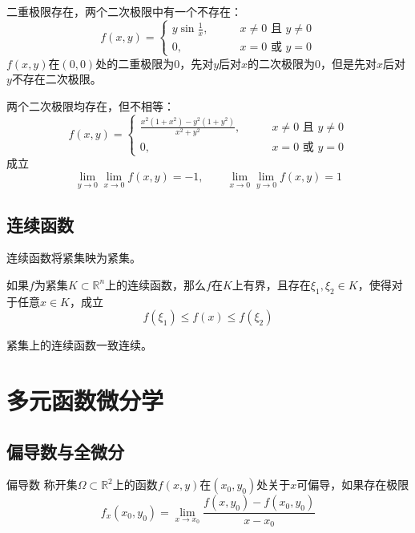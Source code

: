 \documentclass[lang = cn, scheme = chinese, thmcnt = section]{elegantbook}
\newcommand{\R}{\mathbb{R}}            %
\newcommand{\sub}{\subset}             %
\begin{document}
\begin{example}
	二重极限存在，两个二次极限中有一个不存在：
	$$
	f(x,y)=
	\begin{cases}
		y\sin\frac{1}{x},\qquad & x\ne 0\text{ 且 }y\ne 0\\
		0,\qquad & x= 0\text{ 或 }y=0
	\end{cases}
	$$
	$f(x,y)$在$(0,0)$处的二重极限为$0$，先对$y$后对$x$的二次极限为$0$，但是先对$x$后对$y$不存在二次极限。
\end{example}

\begin{example}
	两个二次极限均存在，但不相等：
	$$
	f(x,y)=\begin{cases}
		\frac{x^2(1+x^2)-y^2(1+y^2)}{x^2+y^2},\qquad & x\ne 0\text{ 且 }y\ne 0\\
		0,\qquad & x= 0\text{ 或 }y=0
	\end{cases}
	$$
	成立
	$$
	\lim_{y\to 0}\lim_{x\to 0}f(x,y)=-1,\qquad 
	\lim_{x\to 0}\lim_{y\to 0}f(x,y)=1
	$$
\end{example}

\section{连续函数}

\begin{theorem}
	连续函数将紧集映为紧集。
\end{theorem}

\begin{theorem}
	如果$f$为紧集$K\sub\R^n$上的连续函数，那么$f$在$K$上有界，且存在$\xi_1,\xi_2\in K$，使得对于任意$x\in K$，成立
	$$
	f(\xi_1)\le f(x) \le f(\xi_2)
	$$
\end{theorem}

\begin{theorem}
	紧集上的连续函数一致连续。
\end{theorem}

\chapter{多元函数微分学}

\section{偏导数与全微分}

\begin{definition}{偏导数}
	称开集$\Omega\sub\R^2$上的函数$f(x,y)$在$(x_0,y_0)$处关于$x$可偏导，如果存在极限
	$$
	f_x(x_0,y_0)
	=\lim_{x\to x_0}\frac{f(x,y_0)-f(x_0,y_0)}{x-x_0}
	$$
\end{definition}
\end{document}

